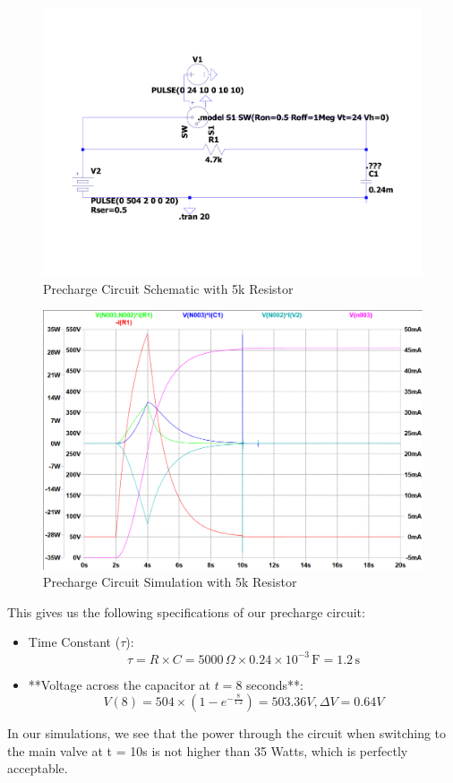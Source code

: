 \begin{figure}[ht]
    \centering
    \includegraphics[width=\linewidth]{texfiles/elec/eimg/PrechargeCircuit}
    \caption{Precharge Circuit Schematic with 5k Resistor}
    \label{fig:PrechargeCircuit}
\end{figure}

\begin{figure}[ht]
    \centering
    \includegraphics[width=\linewidth]{texfiles/elec/eimg/PrechargeSim5k504V}
    \caption{Precharge Circuit Simulation with 5k Resistor}
    \label{fig:PrechargeSim5k504V}
\end{figure}

This gives us the following specifications of our precharge circuit:
\begin{itemize}
\item Time Constant (\( \tau \)):
\[ \tau = R \times C = 5000 \, \Omega \times 0.24 \times 10^{-3} \, \text{F} = 1.2 \, \text{s} \]

\item **Voltage across the capacitor at \( t = 8 \) seconds**:
\[ V(8) = 504 \times \left(1 - e^{-\frac{8}{1.2}}\right) = 503.36V, \Delta V = 0.64V \]
\end{itemize}
In our simulations, we see that the power through the circuit when switching to the main valve at t = 10s is not higher than 35 Watts, which is perfectly acceptable.

